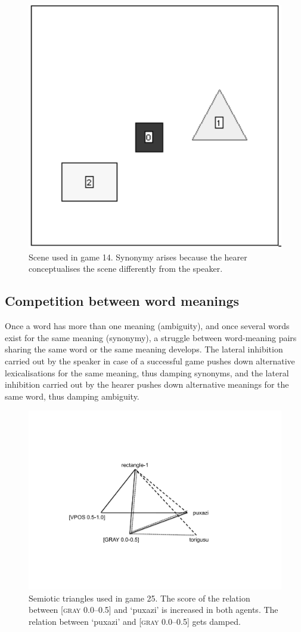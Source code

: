 \begin{figure}[htbp]
  \centerline{\includegraphics[width=.40\textwidth]{chap6/figs/scene-game14.pdf}}
\caption{\label{scene-game14}Scene used
in game 14. Synonymy arises because the hearer conceptualises
the scene differently from the speaker.}
\end{figure}

\subsection{Competition between word meanings }

Once a word has more than one meaning (ambiguity), 
and once several words exist for the same meaning 
(synonymy), a struggle between word-meaning
pairs sharing the same word or the 
same meaning develops. The lateral inhibition carried out by the 
speaker in case of a successful game pushes
down alternative lexicalisations for the same meaning, 
thus damping synonyms, and the lateral inhibition carried out 
by the hearer pushes down alternative meanings for the 
same word, thus damping ambiguity. 


\begin{figure}[htbp]
  \centerline{\includegraphics[width=.60\textwidth]{chap6/figs/triangle5.pdf}}
\caption{\label{triangle5}Semiotic triangles used 
in game 25. The score of the relation between [\textsc{gray} 0.0–0.5] and 
`puxazi' is increased in both agents. The relation between `puxazi' and 
{}[\textsc{gray} 0.0–0.5] gets damped.}
\end{figure}

